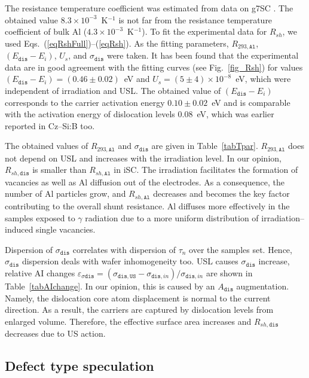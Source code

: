 \documentclass[aip,jap, amsmath,amssymb,reprint]{revtex4-1}
\begin{document}
The resistance temperature coefficient was estimated from data on g7SC .
The obtained value $8.3\times10^{-3}$~K$^{-1}$ is not far from the resistance temperature coefficient of bulk Al ($4.3\times10^{-3}$~K$^{-1}$).
To fit the experimental data for $R_{sh}$, we used Eqs.~(\ref{eqRshFull})--(\ref{eqRsh}).
As the fitting parameters, $R_{293,\mathtt{Al}}$, $(E_{\mathtt{dis}}-E_i)$, $U_s$, and $\sigma_{\mathtt{dis}}$ were taken.
It has been found that the experimental data are in good agreement with the fitting curves (see Fig.~\ref{fig_Rsh}) for values $(E_{\mathtt{dis}}-E_i)=(0.46\pm0.02)$~eV and $U_s=(5\pm4)\times10^{-8}$~eV, which were independent of irradiation and USL.
The obtained value of $(E_{\mathtt{dis}}-E_i)$ corresponds to the carrier activation energy $0.10\pm0.02$~eV and
is comparable with the
activation energy of dislocation levels $0.08$~eV,
which was earlier reported\cite{disl10:Castaldini,disl10:Isakova,disl10:Yu,disl10:Kveder,disl10:Trushin}
in Cz--Si:B too.\cite{disl10:Castaldini,disl10:Isakova,disl10:Yu}


The obtained values of $R_{293,\mathtt{Al}}$ and $\sigma_{\mathtt{dis}}$ are given in Table~\ref{tabTpar}.
$R_{293,\mathtt{Al}}$ does not depend on USL and increases with the irradiation level.
In our opinion, $R_{sh,\mathtt{dis}}$ is smaller than $R_{sh,\mathtt{Al}}$ in iSC.
The irradiation facilitates the formation of vacancies as well as Al diffusion out of the electrodes.
As a consequence, the number of Al particles grow, and $R_{sh,\mathtt{Al}}$ decreases and becomes the key factor contributing to the overall shunt resistance.
Al diffuses more effectively in the samples exposed to $\gamma$ radiation due to a more uniform distribution of irradiation--induced single vacancies.

Dispersion of $\sigma_{\mathtt{dis}}$ correlates with dispersion of $\tau_n$ over the samples set.
Hence, $\sigma_{\mathtt{dis}}$ dispersion deals with wafer inhomogeneity too.
USL causes  $\sigma_{\mathtt{dis}}$ increase, relative AI changes
$\varepsilon_{\sigma\mathtt{dis}}=(\sigma_{\mathtt{dis,US}}-\sigma_{\mathtt{dis},in})/\sigma_{\mathtt{dis},in}$
are shown in Table~\ref{tabAIchange}.
In our opinion, this is caused by an $A_\mathtt{dis}$ augmentation.
Namely, the dislocation core atom displacement  is  normal to the  current direction.
As a result, the carriers are captured by dislocation levels from enlarged volume.
Therefore, the effective surface area increases and $R_{sh,\mathtt{dis}}$ decreases due to US action.


\subsection{Defect type speculation\label{DefectType}}
\end{document}
